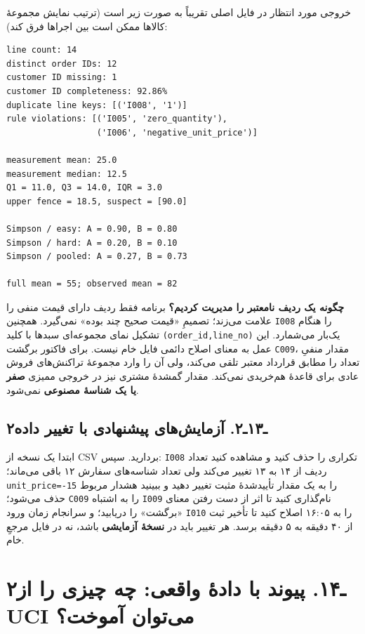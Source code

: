 \documentclass[12pt,a4paper,oneside]{book}
\begin{document}
خروجی مورد انتظار در فایل اصلی تقریباً به صورت زیر است (ترتیب نمایش مجموعهٔ کالاها ممکن است بین اجراها فرق کند):

\begin{verbatim}
line count: 14
distinct order IDs: 12
customer ID missing: 1
customer ID completeness: 92.86%
duplicate line keys: [('I008', '1')]
rule violations: [('I005', 'zero_quantity'),
                  ('I006', 'negative_unit_price')]

measurement mean: 25.0
measurement median: 12.5
Q1 = 11.0, Q3 = 14.0, IQR = 3.0
upper fence = 18.5, suspect = [90.0]

Simpson / easy: A = 0.90, B = 0.80
Simpson / hard: A = 0.20, B = 0.10
Simpson / pooled: A = 0.27, B = 0.73

full mean = 55; observed mean = 82
\end{verbatim}

\textbf{چگونه یک ردیف نامعتبر را مدیریت کردیم؟} برنامه فقط ردیف دارای قیمت منفی را علامت می‌زند؛ تصمیمِ «قیمت صحیح چند بوده» نمی‌گیرد. همچنین \texttt{I008} را هنگام تشکیل نمای مجموعه‌ای سبدها با کلید \texttt{(order\_id,line\_no)} یک‌بار می‌شمارد. این عمل به معنای اصلاح دائمی فایل خام نیست. برای فاکتور برگشت \texttt{C009}، مقدار منفیِ تعداد را مطابق قرارداد معتبر تلقی می‌کند، ولی آن را وارد مجموعهٔ تراکنش‌های فروش عادی برای قاعدهٔ هم‌خریدی نمی‌کند. مقدار گمشدهٔ مشتری نیز در خروجی ممیزی \textbf{صفر یا یک شناسهٔ مصنوعی} نمی‌شود.

\subsection{۲ـ۱۳ـ۲. آزمایش‌های پیشنهادی با تغییر داده}\label{ux640ux6f1ux6f3ux640ux6f2.-ux622ux632ux645ux627ux6ccux634ux647ux627ux6cc-ux67eux6ccux634ux646ux647ux627ux62fux6cc-ux628ux627-ux62aux63aux6ccux6ccux631-ux62fux627ux62fux647}

ابتدا یک نسخه از CSV بردارید. سپس: \texttt{I008} تکراری را حذف کنید و مشاهده کنید تعداد ردیف از ۱۴ به ۱۳ تغییر می‌کند ولی تعداد شناسه‌های سفارش ۱۲ باقی می‌ماند؛ \texttt{unit\_price=-15} را به یک مقدار تأییدشدهٔ مثبت تغییر دهید و ببینید هشدار مربوط حذف می‌شود؛ \texttt{C009} را به اشتباه \texttt{I009} نام‌گذاری کنید تا اثر از دست رفتن معنای «برگشت» را دریابید؛ و سرانجام زمان ورود \texttt{I010} را به ۱۶:۰۵ اصلاح کنید تا تأخیر ثبت از ۴۰ دقیقه به ۵ دقیقه برسد. هر تغییر باید در \textbf{نسخهٔ آزمایشی} باشد، نه در فایل مرجعِ خام.

\section{۲ـ۱۴. پیوند با دادهٔ واقعی: چه چیزی را از UCI می‌توان آموخت؟}\label{ux640ux6f1ux6f4.-ux67eux6ccux648ux646ux62f-ux628ux627-ux62fux627ux62fux647-ux648ux627ux642ux639ux6cc-ux686ux647-ux686ux6ccux632ux6cc-ux631ux627-ux627ux632-uci-ux645ux6ccux62aux648ux627ux646-ux622ux645ux648ux62eux62a}
\end{document}
